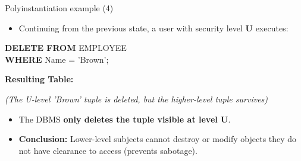 \begin{frame}{Polyinstantiation example (4)}
    \large
    \begin{itemize}
        \item Continuing from the previous state, a user with security level \textbf{U} executes:
    \end{itemize}
    
    \vspace{0.2cm}
    \begin{flushleft}
        \ttfamily \textbf{DELETE FROM} EMPLOYEE \\
        \textbf{WHERE} Name = 'Brown';
    \end{flushleft}
    
    \vspace{0.2cm}
    \textbf{Resulting Table:}
    
    \begin{center}
    \vspace{-0.2cm}
    \end{center}
    \small \centering \textit{(The U-level 'Brown' tuple is deleted, but the higher-level tuple survives)}
    
    \vspace{0.05cm}
    \begin{itemize}
        \normalsize
        \item The DBMS \textbf{only deletes the tuple visible at level U}.
        \item \textbf{Conclusion:} Lower-level subjects cannot destroy or modify objects they do not have clearance to access (prevents sabotage).
    \end{itemize}
\end{frame}



